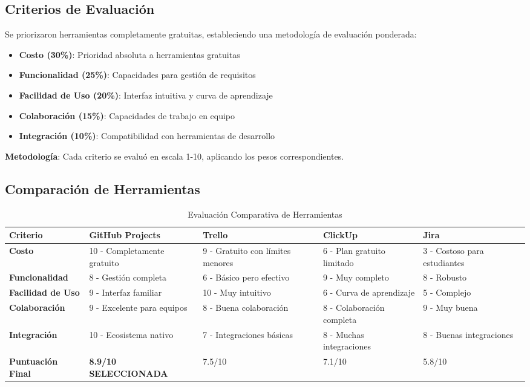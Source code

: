 \documentclass[12pt,a4paper]{article}
\begin{document}
\subsection{Criterios de Evaluación}

Se priorizaron herramientas completamente gratuitas, estableciendo una metodología de evaluación ponderada:

\begin{itemize}[itemsep=0.3em]
    \item \textbf{Costo (30\%)}: Prioridad absoluta a herramientas gratuitas
    \item \textbf{Funcionalidad (25\%)}: Capacidades para gestión de requisitos
    \item \textbf{Facilidad de Uso (20\%)}: Interfaz intuitiva y curva de aprendizaje
    \item \textbf{Colaboración (15\%)}: Capacidades de trabajo en equipo
    \item \textbf{Integración (10\%)}: Compatibilidad con herramientas de desarrollo
\end{itemize}

\textbf{Metodología}: Cada criterio se evaluó en escala 1-10, aplicando los pesos correspondientes.

\subsection{Comparación de Herramientas}

\begin{table}[H]
\centering
\caption{Evaluación Comparativa de Herramientas}
\small
\begin{tabular}{|p{2.8cm}|p{2.8cm}|p{2.8cm}|p{2.8cm}|p{2.8cm}|}
\hline
\rowcolor{headercolor!30}
\textbf{\color{white}Criterio} & \textbf{\color{white}GitHub Projects} & \textbf{\color{white}Trello} & \textbf{\color{white}ClickUp} & \textbf{\color{white}Jira} \\
\hline
\textbf{Costo} & 10 - Completamente gratuito & 9 - Gratuito con límites menores & 6 - Plan gratuito limitado & 3 - Costoso para estudiantes \\
\hline
\textbf{Funcionalidad} & 8 - Gestión completa & 6 - Básico pero efectivo & 9 - Muy completo & 8 - Robusto \\
\hline
\textbf{Facilidad de Uso} & 9 - Interfaz familiar & 10 - Muy intuitivo & 6 - Curva de aprendizaje & 5 - Complejo \\
\hline
\textbf{Colaboración} & 9 - Excelente para equipos & 8 - Buena colaboración & 8 - Colaboración completa & 9 - Muy buena \\
\hline
\textbf{Integración} & 10 - Ecosistema nativo & 7 - Integraciones básicas & 8 - Muchas integraciones & 8 - Buenas integraciones \\
\hline
\hline
\rowcolor{successgreen!30}
\textbf{Puntuación Final} & \textbf{8.9/10 SELECCIONADA} & 7.5/10 & 7.1/10 & 5.8/10 \\
\hline
\end{tabular}
\end{table}
\end{document}
